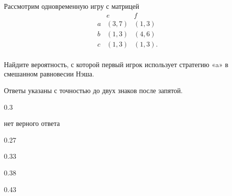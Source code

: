 
\begin{question}
Рассмотрим одновременную игру с матрицей \[
\begin{matrix}
   & e & f \\
a  & (3, 7) & (1, 3) \\
b  & (1, 3) & (4, 6) \\
c  & (1, 3) & (1, 3). \\
\end{matrix}
\]

Найдите вероятность, с которой первый игрок использует стратегию «a» в
смешанном равновесии Нэша.

Ответы указаны с точностью до двух знаков после запятой.
\begin{answerlist}
  \item 0.3
  \item нет верного ответа
  \item 0.27
  \item 0.33
  \item 0.38
  \item 0.43
\end{answerlist}
\end{question}


